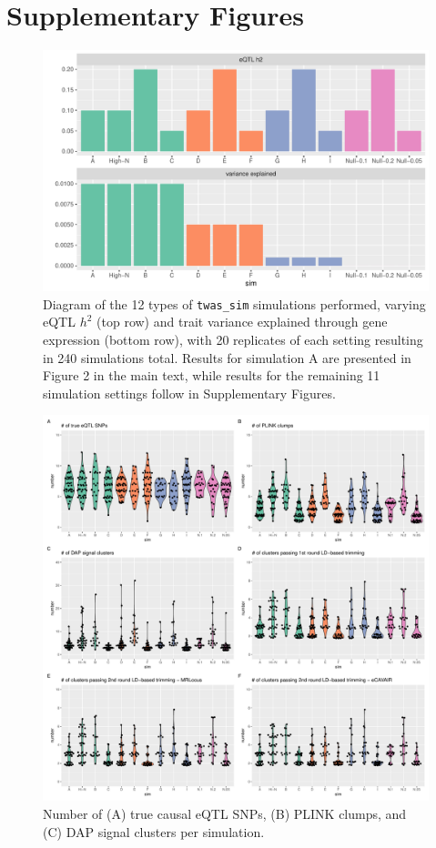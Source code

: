 \documentclass[11pt]{article}
\begin{document}
\clearpage

\section*{Supplementary Figures}

\begin{figure}[!ht]
  \centering
  \includegraphics[width=.7\textwidth]{figs/sim_types}
  \caption{Diagram of the 12 types of \texttt{twas\_sim} simulations
    performed, varying eQTL $h^2$ (top row) and trait variance explained
    through gene expression (bottom row), with 20 replicates of each
    setting resulting in 240 simulations total. Results for simulation
    A are presented in Figure 2 in the main text, while results for
    the remaining 11 simulation settings follow in Supplementary
    Figures.}
\end{figure}

\begin{figure}[!ht]
  \centering
  \includegraphics[width=\textwidth]{figs/sim_details}
  \caption{Number of (A) true causal eQTL SNPs, (B) PLINK clumps, and
    (C) DAP signal clusters per simulation.}
\end{figure}
\end{document}

